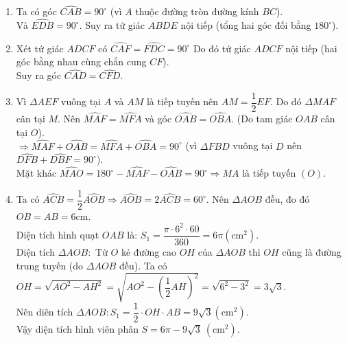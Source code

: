 \begin{ex}
{\begin{enumerate}
\item Ta có góc $\widehat{CAB} = 90^\circ$ (vì $A$ thuộc đường tròn đường kính $BC$).\\
Và $\widehat{EDB}=90^\circ$. Suy ra tứ giác $ABDE$ nội tiếp (tổng hai góc đối bằng $180^\circ$).
\item Xét tứ giác $ADCF$ có $\widehat{CAF} = \widehat{FDC} = 90^\circ$ Do đó tứ giác $ADCF$ nội tiếp (hai góc bằng nhau cùng chắn cung $CF$).\\
 Suy ra góc $\widehat{CAD}=\widehat{CFD}$.
\item Vì $\Delta AEF$ vuông tại $A$ và $AM$ là tiếp tuyến nên $AM = \dfrac{1}{2}EF$. Do đó $\Delta MAF$ cân tại $M$. Nên $\widehat{MAF}=\widehat{MFA}$ và góc $\widehat{OAB} = \widehat{OBA}.$ (Do tam giác $OAB$ cân tại $O$). \\
$\Rightarrow \widehat{MAF}+\widehat{OAB} = \widehat{MFA}+\widehat{OBA}=90^\circ$ (vì $\Delta FBD$ vuông tại $D$ nên $\widehat{DFB}+\widehat{DBF}=90^\circ$).\\
Mặt khác $\widehat{MAO}=180^\circ - \widehat{MAF}- \widehat{OAB} = 90^\circ \Rightarrow MA \mbox{ là tiếp tuyến } (O)$.
\item Ta có $\widehat{ACB}=\dfrac{1}{2}\widehat{AOB} \Rightarrow \widehat{AOB} = 2\widehat{ACB}=60^\circ$. Nên $\Delta AOB$ đều, đo đó $OB = AB = 6\mbox{cm}$.\\
Diện tích hình quạt $OAB$ là: $S_1 = \dfrac{\pi\cdot 6^2 \cdot 60}{360}=6\pi (\mbox{cm}^2)$.\\
Diện tích $\Delta AOB:$ Từ $O$ kẻ đường cao $OH$ của $\Delta AOB$ thì $OH$ cũng là đường trung tuyến (do $\Delta AOB$ đều). Ta có $OH = \sqrt{AO^2-AH^2}=\sqrt{AO^2-\left(\dfrac{1}{2}AH\right)^2}=\sqrt{6^2-3^2} =3\sqrt{3}$.\\
Nên diên tích $\Delta AOB: S_1 =\dfrac{1}{2}\cdot OH \cdot AB=9\sqrt{3} (\mbox{cm}^2)$.\\
Vậy diện tích hình viên phân $S = 6\pi -9\sqrt{3}\ (\mbox{cm}^2)$.
\end{enumerate}
}
\end{ex}

